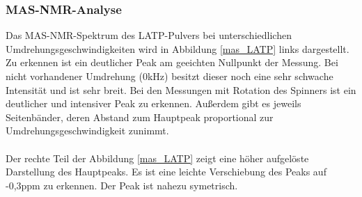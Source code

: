 \documentclass[a4paper, 11pt, headsepline,footsepline,twoside,abstract]{scrbook}
\begin{document}
\subsubsection{MAS-NMR-Analyse}
Das MAS-NMR-Spektrum des LATP-Pulvers bei unterschiedlichen Umdrehungsgeschwindigkeiten wird in Abbildung \ref{mas_LATP} links dargestellt. Zu erkennen ist ein deutlicher Peak am geeichten Nullpunkt der Messung. Bei nicht vorhandener Umdrehung (0kHz) besitzt dieser noch eine sehr schwache Intensität und ist sehr breit. Bei den Messungen mit Rotation des Spinners ist ein deutlicher und intensiver Peak zu erkennen. Außerdem gibt es jeweils Seitenbänder, deren Abstand zum Hauptpeak proportional zur Umdrehungsgeschwindigkeit zunimmt.
\\\\
Der rechte Teil der Abbildung \ref{mas_LATP} zeigt eine höher aufgelöste Darstellung des Hauptpeaks. Es ist eine leichte Verschiebung des Peaks auf -0,3ppm zu erkennen. Der Peak ist nahezu symetrisch. 
\newpage
\end{document}
